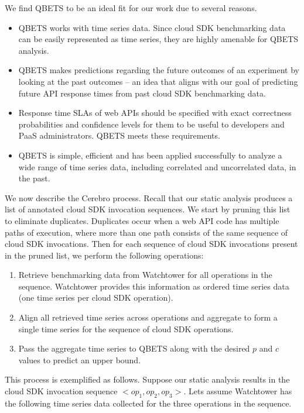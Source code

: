 We find QBETS to be an ideal fit for our work due to several reasons. 
\begin{itemize}
\item QBETS works with time series data. Since
cloud SDK benchmarking data can be easily represented as time series,
they are highly amenable for QBETS analysis. 
\item QBETS makes predictions regarding the
future outcomes of an experiment by looking at the past 
outcomes -- an idea that aligns with our
goal of predicting future API response times from past cloud SDK benchmarking data. 
\item Response time
SLAs of web APIs should be specified with exact correctness 
probabilities and confidence levels for
them to be useful to developers and PaaS administrators. QBETS meets these requirements.
\item QBETS is 
simple, efficient and has been applied successfully to analyze a wide range of time series 
data, including correlated and uncorrelated data, in the past.
\end{itemize}

We now describe the Cerebro process.
Recall that our static analysis produces a list of annotated cloud SDK invocation sequences.
We start by pruning this list to eliminate duplicates. 
Duplicates occur when a web API code has
multiple paths of execution, where more than one path consists of the same sequence of cloud 
SDK invocations. Then for each sequence of cloud SDK 
invocations present in the pruned list, we
perform the following operations:

\begin{enumerate}
\item Retrieve benchmarking data from Watchtower 
for all operations in the sequence. Watchtower provides
this information as ordered time series data (one time series per cloud SDK operation).
\item Align all retrieved time series across operations and aggregate
to form a single time series for the sequence of cloud SDK operations.
\item Pass the aggregate time series to QBETS along with the 
desired $p$ and $c$ values to predict an
upper bound. 
\end{enumerate}

This process is exemplified as follows.
Suppose our static analysis results in the
cloud SDK invocation sequence $<op_{1},op_{2},op_{3}>$. 
Lets assume Watchtower has the following
time series data collected for the three operations in the sequence.

